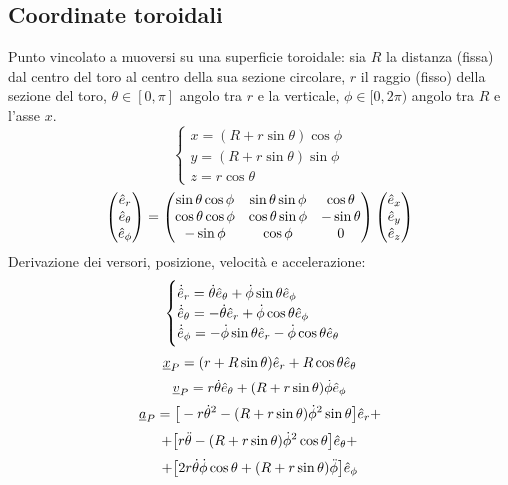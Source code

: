 \documentclass[11pt,landscape]{article}
\begin{document}
\begin{multicols}{3}
    \subsection{Coordinate toroidali}
        Punto vincolato a muoversi su una superficie toroidale: sia $R$ la distanza (fissa) dal centro del toro al centro della sua sezione circolare, $r$ il raggio (fisso) della sezione del toro, $\theta \in [0, \pi]$ angolo tra $r$ e la verticale, $\phi \in [0, 2\pi)$ angolo tra $R$ e l'asse $x$. 
        $$ \begin{cases}
            x = (R + r \sin \theta) \cos \phi\\
            y = (R + r \sin \theta) \sin \phi\\
            z = r \cos \theta
        \end{cases}$$ 
        $$ \begin{pmatrix}
            \hat{e}_r\\ \hat{e}_\theta \\ \hat{e}_\phi
        \end{pmatrix} = 
        \begin{pmatrix}
            \sin \theta \cos \phi & \sin \theta \sin \phi & \cos \theta \\
            \cos \theta \cos \phi & \cos \theta \sin \phi & -\sin \theta \\
            - \sin \phi & \cos \phi & 0
        \end{pmatrix} \begin{pmatrix} \hat{e}_x \\ \hat{e}_y \\ \hat{e}_z \end{pmatrix}$$
        Derivazione dei versori, posizione, velocità e accelerazione:
        $$ \begin{cases}
            \dot{\hat{e}}_r = \dot{\theta} \hat{e}_\theta + \dot{\phi} \sin \theta \hat{e}_\phi\\
            \dot{\hat{e}}_\theta = -\dot{\theta} \hat{e}_r + \dot{\phi} \cos \theta \hat{e}_\phi\\
            \dot{\hat{e}}_\phi  = - \dot{\phi} \sin \theta \hat{e}_r - \dot{\phi}\cos \theta \hat{e}_\theta
        \end{cases}$$
        $$ \underline{x}_P = (r + R\sin \theta)\hat{e}_r + R\cos \theta \hat{e}_\theta$$
        $$ \underline{v}_P = r \dot{\theta} \hat{e}_\theta + (R + r\sin \theta) \dot{\phi} \hat{e}_\phi$$
        $$ \underline{a}_P =\big[-r \dot \theta ^2 - (R + r\sin \theta) \dot \phi ^2 \sin \theta \big] \hat{e}_r +$$ $$ + \big[r \ddot \theta - (R + r\sin \theta) \dot \phi ^2 \cos \theta \big]\hat{e}_\theta + $$ $$ + \big[2r \dot \theta \dot \phi \cos \theta + (R + r\sin \theta) \ddot \phi \big]\hat{e}_\phi$$
    

\end{multicols}
\end{document}
